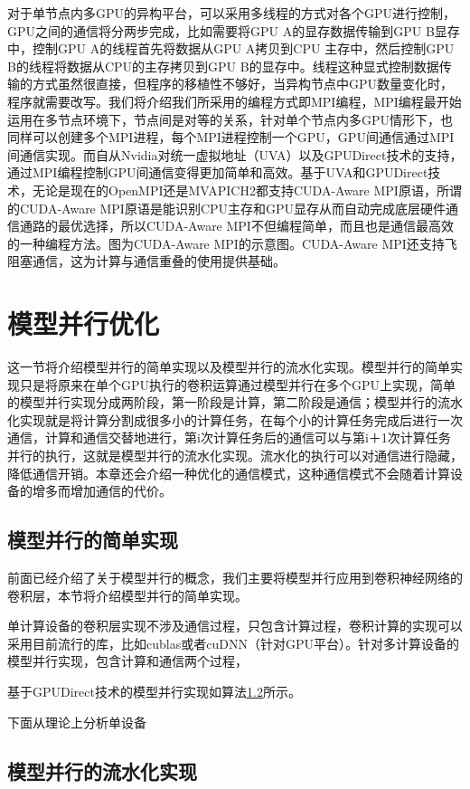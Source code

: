 对于单节点内多GPU的异构平台，可以采用多线程的方式对各个GPU进行控制，GPU之间的通信将分两步完成，比如需要将GPU A的显存数据传输到GPU B显存中，控制GPU A的线程首先将数据从GPU A拷贝到CPU 主存中，然后控制GPU B的线程将数据从CPU的主存拷贝到GPU B的显存中。线程这种显式控制数据传输的方式虽然很直接，但程序的移植性不够好，当异构节点中GPU数量变化时，程序就需要改写。我们将介绍我们所采用的编程方式即MPI编程，MPI编程最开始运用在多节点环境下，节点间是对等的关系，针对单个节点内多GPU情形下，也同样可以创建多个MPI进程，每个MPI进程控制一个GPU，GPU间通信通过MPI间通信实现。而自从Nvidia对统一虚拟地址（UVA）以及GPUDirect技术的支持，通过MPI编程控制GPU间通信变得更加简单和高效。基于UVA和GPUDirect技术，无论是现在的OpenMPI还是MVAPICH2都支持CUDA-Aware MPI原语，所谓的CUDA-Aware MPI原语是能识别CPU主存和GPU显存从而自动完成底层硬件通信通路的最优选择，所以CUDA-Aware MPI不但编程简单，而且也是通信最高效的一种编程方法。图为CUDA-Aware MPI的示意图。CUDA-Aware MPI还支持飞阻塞通信，这为计算与通信重叠的使用提供基础。

\section{模型并行优化}
这一节将介绍模型并行的简单实现以及模型并行的流水化实现。模型并行的简单实现只是将原来在单个GPU执行的卷积运算通过模型并行在多个GPU上实现，简单的模型并行实现分成两阶段，第一阶段是计算，第二阶段是通信；模型并行的流水化实现就是将计算分割成很多小的计算任务，在每个小的计算任务完成后进行一次通信，计算和通信交替地进行，第i次计算任务后的通信可以与第i＋1次计算任务并行的执行，这就是模型并行的流水化实现。流水化的执行可以对通信进行隐藏，降低通信开销。本章还会介绍一种优化的通信模式，这种通信模式不会随着计算设备的增多而增加通信的代价。

\subsection{模型并行的简单实现}
前面已经介绍了关于模型并行的概念，我们主要将模型并行应用到卷积神经网络的卷积层，本节将介绍模型并行的简单实现。

单计算设备的卷积层实现不涉及通信过程，只包含计算过程，卷积计算的实现可以采用目前流行的库，比如cublas或者cuDNN（针对GPU平台）。针对多计算设备的模型并行实现，包含计算和通信两个过程，



基于GPUDirect技术的模型并行实现如算法\ref{}所示。

下面从理论上分析单设备

\subsection{模型并行的流水化实现}

